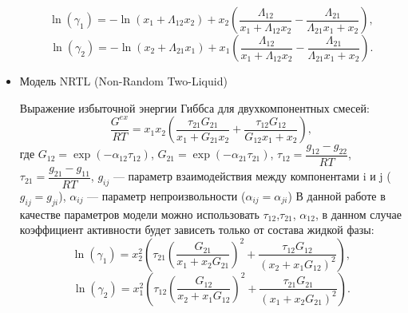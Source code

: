\begin{itemize}
	\begin{equation}
	\ln(\gamma_1)=-\ln(x_1 + \Lambda_{12} x_2) + x_2 \left( \dfrac{\Lambda_{12}}{x_1 + \Lambda_{12} x_2 } - \dfrac{\Lambda_{21}}{\Lambda_{21} x_1+x_2} \right),
	\end{equation}
	\begin{equation}
	\ln(\gamma_2)=-\ln(x_2 + \Lambda_{21} x_1) + x_1 \left( \dfrac{\Lambda_{12}}{x_1 + \Lambda_{12} x_2 } - \dfrac{\Lambda_{21}}{\Lambda_{21} x_1+x_2} \right).
	\end{equation} 
	
	\item Модель NRTL (Non-Random Two-Liquid)
	
	Выражение избыточной энергии Гиббса для двухкомпонентных смесей:
	\begin{equation}\label{eq.phase.nrtl}
	\dfrac{G^{ex}}{RT}=x_1 x_2 \left( \dfrac{\tau_{21}G_{21}}{x_1 + G_{21} x_2} + \dfrac{\tau_{12} G_{12}}{G_{12} x_1 +x_2} \right),
	\end{equation}
	где $G_{12}=\exp(-\alpha_{12} \tau_{12})$,  $G_{21}=\exp(-\alpha_{21} \tau_{21})$, $\tau_{12}=\dfrac{g_{12}-g_{22}}{RT}$, $\tau_{21}=\dfrac{g_{21}-g_{11}}{RT}$, $g_{ij}$ --- параметр взаимодействия между компонентами i и j ($g_{ij}=g_{ji}$), $\alpha_{ij}$ --- параметр непроизвольности ($\alpha_{ij}=\alpha_{ji}$)
	В данной работе в качестве параметров модели можно использовать $\tau_{12}$,$\tau_{21}$, $\alpha_{12}$, в данном случае коэффициент активности будет зависеть только от состава жидкой фазы:
	\begin{equation}
	\ln(\gamma_1)=x^2_2 \left( \tau_{21} \left(\dfrac{G_{21}}{x_1+x_2 G_{21}}\right)^2 + \dfrac{\tau_{12} G_{12}}{(x_2+x_1 G_{12})^2} \right),
	\end{equation}
	\begin{equation}
	\ln(\gamma_2)=x^2_1 \left( \tau_{12} \left(\dfrac{G_{12}}{x_2+x_1 G_{12}}\right)^2 + \dfrac{\tau_{21} G_{21}}{(x_1+x_2 G_{21})^2} \right).
	\end{equation} 
\end{itemize}

